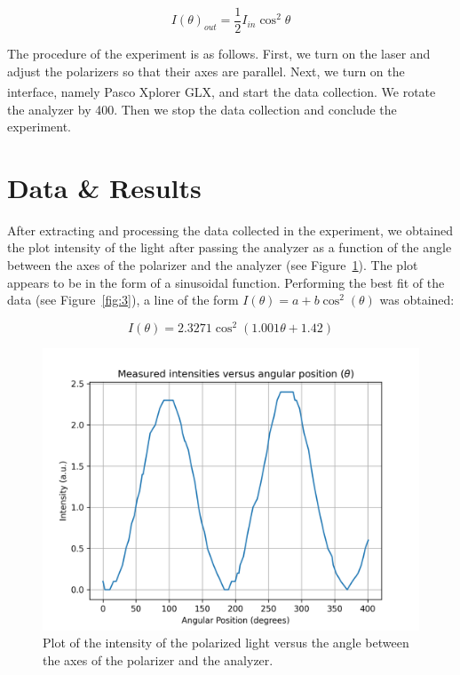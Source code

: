 \documentclass[10pt]{article}
\begin{document}
\begin{equation}
  I(\theta)_{out} = \dfrac{1}{2}I_{in}\cos^2\theta
\end{equation}

The procedure of the experiment is as follows. First, we turn on the laser and adjust the polarizers so that their axes are parallel. Next, we turn on the interface, namely Pasco\textsuperscript{\textregistered} Xplorer GLX, and start the data collection. We rotate the analyzer by 400\degree. Then we stop the data collection and conclude the experiment.

\section{Data \& Results}

After extracting and processing the data collected in the experiment, we obtained the plot intensity of the light after passing the analyzer as a function of the angle between the axes of the polarizer and the analyzer (see Figure~\ref{fig:2}).
The plot appears to be in the form of a sinusoidal function. Performing the best fit of the data (see Figure~\ref{fig:3}), a line of the form $I(\theta) = a + b\cos^2(\theta)$ was obtained:

\begin{equation}
  I(\theta) = 2.3271\cos^2(1.001\theta+1.42)
  \label{eq:2}
\end{equation}

\begin{figure}[ht]
  \centering
  \includegraphics[scale=0.6]{plots/plot1.png}
  \caption{Plot of the intensity of the polarized light versus the angle between the axes of the polarizer and the analyzer.}
  \label{fig:2}
\end{figure}
\end{document}
